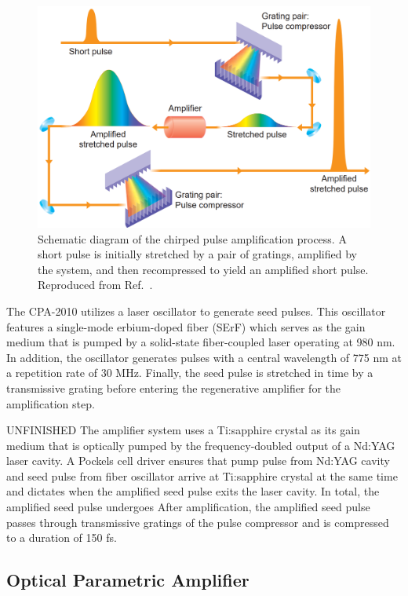 \begin{figure}
	\centering
	\includegraphics[scale=0.35]{images/chapter_methods/cpa_process_service}
	\caption{Schematic diagram of the chirped pulse amplification process. A short pulse is initially stretched by a pair of gratings, amplified by the system, and then recompressed to yield an amplified short pulse. Reproduced from Ref.\ \cite{service154}.}
	\label{fig:cpa_process}
\end{figure}

The CPA-2010 utilizes a laser oscillator to generate seed pulses. This oscillator features a single-mode erbium-doped fiber (SErF) which serves as the gain medium that is pumped by a solid-state fiber-coupled laser operating at 980 nm. In addition, the oscillator generates pulses with a central wavelength of 775 nm at a repetition rate of 30 MHz. Finally, the seed pulse is stretched in time by a transmissive grating before entering the regenerative amplifier for the amplification step. 

{\color{red} UNFINISHED} The amplifier system uses a Ti:sapphire crystal as its gain medium that is optically pumped by the frequency-doubled output of a Nd:YAG laser cavity. A Pockels cell driver ensures that pump pulse from Nd:YAG cavity and seed pulse from fiber oscillator arrive at Ti:sapphire crystal at the same time and dictates when the amplified seed pulse exits the laser cavity. In total, the amplified seed pulse undergoes  After amplification, the amplified seed pulse passes through transmissive gratings of the pulse compressor and is compressed to a duration of 150 fs. 

\subsection{Optical Parametric Amplifier}

